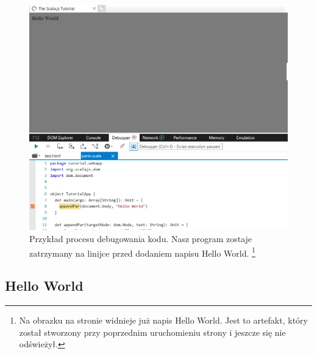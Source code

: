 \begin{figure}[h]
	\centering
	\includegraphics[width=\textwidth]{images/debug.png}
	 \caption[Przykład procesu debugowania kodu. Nasz program zostaje zatrzymany na linijce przed dodaniem napisu Hello World.]
	 {Przykład procesu debugowania kodu. Nasz program zostaje zatrzymany na linijce przed dodaniem napisu Hello World. \footnote{Na obrazku na stronie widnieje już napis Hello World. Jest to artefakt, który został stworzony przy poprzednim uruchomieniu strony i jeszcze się nie odświeżył.}}
\end{figure}



\subsection{Hello World}

